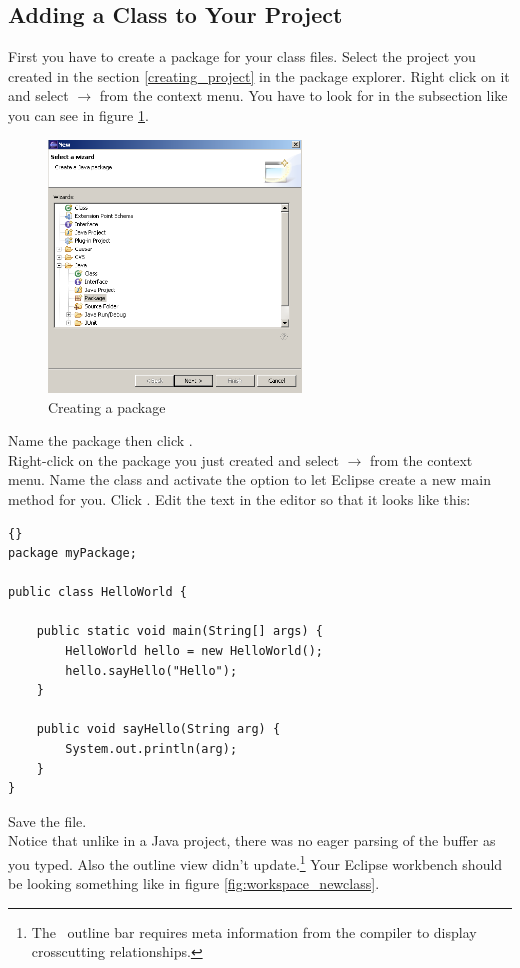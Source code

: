 \subsection{Adding a Class to Your Project}
First you have to create a package for your class files. Select the project you created in the section \ref{creating_project} in the package explorer. Right click on it and select  $\rightarrow$  from the context menu. You have to look for  in the  subsection like you can see in figure \ref{fig:package}.

\begin{figure}[htbp]
	\centering
		\includegraphics[width=0.60\textwidth]{images/package.png}
	\caption{Creating a package}
	\label{fig:package}
\end{figure}

Name the package  then click .\\
Right-click on the package you just created and select  $\rightarrow$  from the context menu. Name the class  and activate the option to let Eclipse create a new main method for you. Click .
Edit the text in the editor so that it looks like this:
	\begin{lstlisting}[basicstyle=\small\it,caption=HelloWorld.java,label=lst:HelloWorld,name=listing:helloworld,frame=none]{}
package myPackage;

public class HelloWorld {

	public static void main(String[] args) {
		HelloWorld hello = new HelloWorld();
		hello.sayHello("Hello");
	}

	public void sayHello(String arg) {
		System.out.println(arg);
	}
}
\end{lstlisting}
Save the file.\\
Notice that unlike in a Java project, there was no eager parsing of the buffer as you typed. Also the outline view didn't update.\footnote{The \caesarj ~outline bar requires meta information from the compiler to display crosscutting relationships.} Your Eclipse workbench should be looking something like in figure \ref{fig:workspace_newclass}.\\

